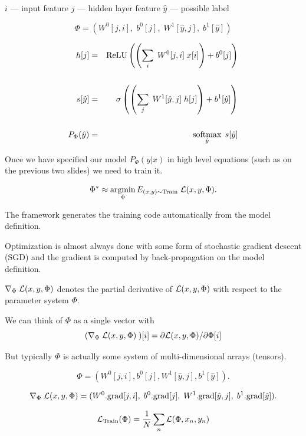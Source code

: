 {\centerline{$i$ --- input feature \hspace{1em} $j$ --- hidden layer feature \hspace{1em} $\hat{y}$ --- possible label}
$$\Phi = (W^0[j,i],\;b^0[j],\;W^1[\hat{y},j],\;b^1[\hat{y}])$$

\vfill
\begin{eqnarray*}
  h[j] & = & \mathrm{ReLU}\left(\left(\sum_i\;W^0[j,i] \;x[i]\right) + b^0[j]\right) \\
  \\
  s[\hat{y}] & = & \sigma\left(\left(\sum_j\;W^1[\hat{y},j]\;h[j]\right) + b^1[\hat{y}]\right) \\
  \\
  P_\Phi(\hat{y}) & = & \operatorname*{softmax}_{\hat{y}}\;s[\hat{y}]
\end{eqnarray*}


Once we have specified our model $P_\Phi(y|x)$ in high level equations (such as on the previous two slides) we need to train it.

$$\Phi^* \approx \operatorname*{argmin}_\Phi E_{(x,y) \sim \mathrm{Train}} \; {\cal L}(x,y,\Phi).$$

\vfill
The framework generates the training code automatically from the model definition.

\vfill
Optimization is almost always done with some form of stochastic gradient descent (SGD) and the gradient is computed
by back-propagation on the model definition.



$\nabla_\Phi\;{\cal L}(x,y,\Phi)$ denotes the partial derivative of ${\cal L}(x,y,\Phi)$ with respect to the parameter system $\Phi$.

\vfill
We can think of $\Phi$ as a single vector with
$$(\nabla_\Phi \;{\cal L}(x,y,\Phi)\;)[i] = \partial {\cal L}(x,y,\Phi) /\partial \Phi[i]$$

\vfill
But typically $\Phi$ is actually some system of multi-dimensional arrays (tensors).

\vfill
$$\Phi = (W^0[j,i],b^0[j],W^1[\hat{y},j],b^1[\hat{y}]).$$

\vfill
$$\nabla_\Phi \;{\cal L}(x,y,\Phi) = (W^0.\mathrm{grad}[j,i],\;b^0.\mathrm{grad}[j],\;W^1.\mathrm{grad}[\hat{y},j],\;b^1.\mathrm{grad}[\hat{y}]).$$


$${\cal L}_{\mathrm{Train}}(\Phi) = \frac{1}{N}\sum_n {\cal L}(\Phi,x_n,y_n)$$

}
